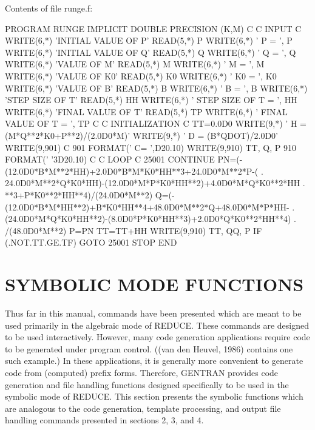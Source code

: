 Contents of file runge.f:
\begin{framedverbatim}
      PROGRAM RUNGE
      IMPLICIT DOUBLE PRECISION (K,M)
C
C  INPUT
C
      WRITE(6,*) 'INITIAL VALUE OF P'
      READ(5,*) P
      WRITE(6,*) ' P = ', P
      WRITE(6,*) 'INITIAL VALUE OF Q'
      READ(5,*) Q
      WRITE(6,*) ' Q = ', Q
      WRITE(6,*) 'VALUE OF M'
      READ(5,*) M
      WRITE(6,*) ' M = ', M
      WRITE(6,*) 'VALUE OF K0'
      READ(5,*) K0
      WRITE(6,*) ' K0 = ', K0
      WRITE(6,*) 'VALUE OF B'
      READ(5,*) B
      WRITE(6,*) ' B = ', B
      WRITE(6,*) 'STEP SIZE OF T'
      READ(5,*) HH
      WRITE(6,*) ' STEP SIZE OF T = ', HH
      WRITE(6,*) 'FINAL VALUE OF T'
      READ(5,*) TP
      WRITE(6,*) ' FINAL VALUE OF T = ', TP
C
C  INITIALIZATION
C
      TT=0.0D0                     
      WRITE(9,*) ' H = (M*Q**2*K0+P**2)/(2.0D0*M)'
      WRITE(9,*) ' D = (B*QDOT)/2.0D0'
      WRITE(9,901) C
901   FORMAT(' C= ',D20.10)
      WRITE(9,910) TT, Q, P
910   FORMAT(' '3D20.10)
C
C  LOOP
C
25001 CONTINUE
          PN=(-(12.0D0*B*M**2*HH)+2.0D0*B*M*K0*HH**3+24.0D0*M**2*P-(
     .     24.0D0*M**2*Q*K0*HH)-(12.0D0*M*P*K0*HH**2)+4.0D0*M*Q*K0**2*HH
     .     **3+P*K0**2*HH**4)/(24.0D0*M**2)
          Q=(-(12.0D0*B*M*HH**2)+B*K0*HH**4+48.0D0*M**2*Q+48.0D0*M*P*HH-
     .     (24.0D0*M*Q*K0*HH**2)-(8.0D0*P*K0*HH**3)+2.0D0*Q*K0**2*HH**4)
     .     /(48.0D0*M**2)
          P=PN
          TT=TT+HH
          WRITE(9,910) TT, QQ, P
      IF (.NOT.TT.GE.TF) GOTO 25001
      STOP
      END
\end{framedverbatim}

\chapter{SYMBOLIC MODE FUNCTIONS}

Thus far in this manual, commands have been presented which are
meant to be used primarily in the algebraic mode of REDUCE.  These
commands are designed to be used interactively.  However,
many code generation applications require code to be generated
under program control.  ((van den Heuvel, 1986) contains one such example.)  In
these applications, it is generally more convenient
to generate code from (computed) prefix forms.  Therefore, GENTRAN provides
code generation and file handling functions designed specifically to be
used in the symbolic mode of REDUCE.  This section
presents the symbolic functions which are analogous to the code generation,
template processing, and output file handling commands presented
in sections 2, 3, and 4.

